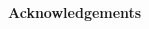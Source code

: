 %
%
%
%
%
%
\ifodd\useracknowledge
\rightfacing
\vspace*{62pt}
\par\noindent
{\Huge\bf Acknowledgements}\hfill
\vspace*{9ex}
\begin{indpar}{0.1875in}{0in}%
%
%
\end{indpar}
\clearpage
\fi					%
%
%
%
%
%
\rightfacing
{}
\noindent
%
%


%
%
%
%
%
%

%
%
